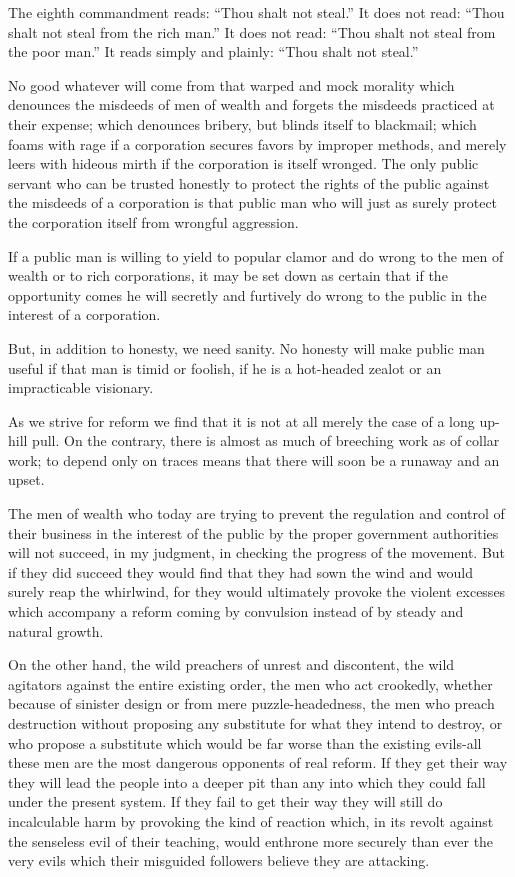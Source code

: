 \documentclass[a4paper]{amsbook}
\begin{document}
The eighth commandment reads: “Thou shalt not steal.” It does not read: “Thou shalt not steal from the rich man.” It does not read: “Thou shalt not steal from the poor man.” It reads simply and plainly: “Thou shalt not steal.”

No good whatever will come from that warped and mock morality which denounces the misdeeds of men of wealth and forgets the misdeeds practiced at their expense; which denounces bribery, but blinds itself to blackmail; which foams with rage if a corporation secures favors by improper methods, and merely leers with hideous mirth if the corporation is itself wronged. The only public servant who can be trusted honestly to protect the rights of the public against the misdeeds of a corporation is that public man who will just as surely protect the corporation itself from wrongful aggression.

If a public man is willing to yield to popular clamor and do wrong to the men of wealth or to rich corporations, it may be set down as certain that if the opportunity comes he will secretly and furtively do wrong to the public in the interest of a corporation.

But, in addition to honesty, we need sanity. No honesty will make public man useful if that man is timid or foolish, if he is a hot-headed zealot or an impracticable visionary.

As we strive for reform we find that it is not at all merely the case of a long up-hill pull. On the contrary, there is almost as much of breeching work as of collar work; to depend only on traces means that there will soon be a runaway and an upset.

The men of wealth who today are trying to prevent the regulation and control of their business in the interest of the public by the proper government authorities will not succeed, in my judgment, in checking the progress of the movement. But if they did succeed they would find that they had sown the wind and would surely reap the whirlwind, for they would ultimately provoke the violent excesses which accompany a reform coming by convulsion instead of by steady and natural growth.

On the other hand, the wild preachers of unrest and discontent, the wild agitators against the entire existing order, the men who act crookedly, whether because of sinister design or from mere puzzle-headedness, the men who preach destruction without proposing any substitute for what they intend to destroy, or who propose a substitute which would be far worse than the existing evils-all these men are the most dangerous opponents of real reform. If they get their way they will lead the people into a deeper pit than any into which they could fall under the present system. If they fail to get their way they will still do incalculable harm by provoking the kind of reaction which, in its revolt against the senseless evil of their teaching, would enthrone more securely than ever the very evils which their misguided followers believe they are attacking.
\end{document}
